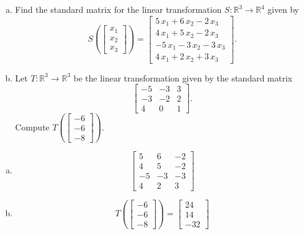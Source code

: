 
\begin{exerciseStatement}

\begin{enumerate}[(a)]
\item Find the standard matrix for the linear transformation \(S:\mathbb{R}^ 3  \to \mathbb{R}^ 4 \) given by \[S\left(  \left[\begin{array}{c}
x_{1} \\
x_{2} \\
x_{3}
\end{array}\right]  \right) =  \left[\begin{array}{c}
5 \, x_{1} + 6 \, x_{2} - 2 \, x_{3} \\
4 \, x_{1} + 5 \, x_{2} - 2 \, x_{3} \\
-5 \, x_{1} - 3 \, x_{2} - 3 \, x_{3} \\
4 \, x_{1} + 2 \, x_{2} + 3 \, x_{3}
\end{array}\right] .\]
\item Let \(T:\mathbb{R}^ 3  \to \mathbb{R}^ 3 \) be the linear transformation given by the standard matrix \[ \left[\begin{array}{ccc}
-5 & -3 & 3 \\
-3 & -2 & 2 \\
4 & 0 & 1
\end{array}\right] .\] Compute \(T\left( \left[\begin{array}{c}
-6 \\
-6 \\
-8
\end{array}\right]  \right)\). 
\end{enumerate}
    
\end{exerciseStatement}
    
\begin{exerciseAnswer} 

\begin{enumerate}[(a)]
\item \[ \left[\begin{array}{ccc}
5 & 6 & -2 \\
4 & 5 & -2 \\
-5 & -3 & -3 \\
4 & 2 & 3
\end{array}\right] \]
\item \[T\left( \left[\begin{array}{c}
-6 \\
-6 \\
-8
\end{array}\right]  \right)= \left[\begin{array}{c}
24 \\
14 \\
-32
\end{array}\right] \]
\end{enumerate}
    
\end{exerciseAnswer}
    
